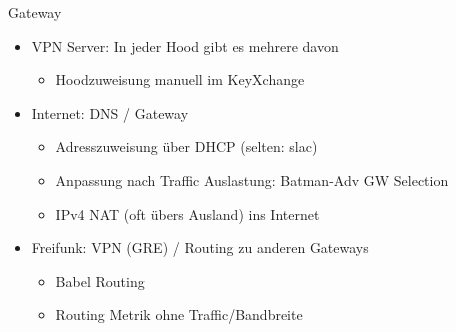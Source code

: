 \begin{frame}{Gateway}
    \begin{itemize}
        \item VPN Server: In jeder Hood gibt es mehrere davon
        \begin{itemize}
            \item Hoodzuweisung manuell im KeyXchange
        \end{itemize}
        \item Internet: DNS / Gateway
        \begin{itemize}
            \item Adresszuweisung über DHCP (selten: slac)
            \item Anpassung nach Traffic Auslastung: Batman-Adv GW Selection
            \item IPv4 NAT (oft übers Ausland) ins Internet
        \end{itemize}
        \item Freifunk: VPN (GRE) / Routing zu anderen Gateways
        \begin{itemize}
            \item Babel Routing
            \item Routing Metrik ohne Traffic/Bandbreite
        \end{itemize}
    \end{itemize}
\end{frame}

